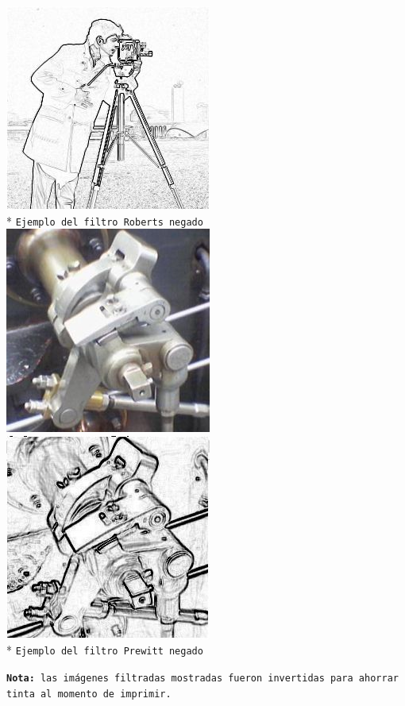\begin{center}
\includegraphics[scale=0.5]{imgs/cameraman-roberts-neg.jpg} \\*
\texttt{\small Ejemplo del filtro Roberts negado}\\
\vspace{1.0cm}
\includegraphics[scale=0.5]{imgs/steam-engine.jpg}
\includegraphics[scale=0.5]{imgs/steam-engine-prewitt-neg.jpg} \\*
\texttt{\small Ejemplo del filtro Prewitt negado} \\
\end{center}
\vspace{1cm}
\texttt{\small \textbf{Nota:} las im\'agenes filtradas mostradas fueron invertidas para ahorrar tinta al momento de imprimir.}
\pagebreak
